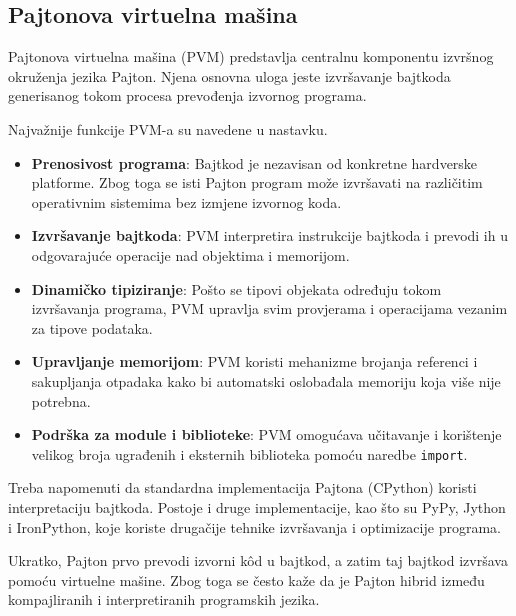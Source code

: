 \subsection{Pajtonova virtuelna mašina}

Pajtonova virtuelna mašina (PVM) predstavlja centralnu komponentu izvršnog okruženja jezika Pajton. Njena osnovna uloga jeste izvršavanje bajtkoda generisanog tokom procesa prevođenja izvornog programa.

Najvažnije funkcije PVM-a su navedene u nastavku. 

\begin{itemize}
	
	\item \textbf{Prenosivost programa}: Bajtkod je nezavisan od konkretne hardverske platforme. Zbog toga se isti Pajton program može izvršavati na različitim operativnim sistemima bez izmjene izvornog koda.
	
	\item \textbf{Izvršavanje bajtkoda}: PVM interpretira instrukcije bajtkoda i prevodi ih u odgovarajuće operacije nad objektima i memorijom.
	
	\item \textbf{Dinamičko tipiziranje}:  Pošto se tipovi objekata određuju tokom izvršavanja programa, PVM upravlja svim provjerama i operacijama vezanim za tipove podataka.
	
	\item \textbf{Upravljanje memorijom}: PVM koristi mehanizme brojanja referenci i sakupljanja otpadaka kako bi automatski oslobađala memoriju koja više nije potrebna.
	
	\item \textbf{Podrška za module i biblioteke}:  PVM omogućava učitavanje i korištenje velikog broja ugrađenih i eksternih biblioteka pomoću naredbe \texttt{import}.

\end{itemize}

Treba napomenuti da standardna implementacija Pajtona (CPython) koristi interpretaciju bajtkoda. Postoje i druge implementacije, kao što su PyPy, Jython i IronPython, koje koriste drugačije tehnike izvršavanja i optimizacije programa.

Ukratko, Pajton prvo prevodi izvorni kôd u bajtkod, a zatim taj bajtkod izvršava pomoću virtuelne mašine. Zbog toga se često kaže da je Pajton hibrid između kompajliranih i interpretiranih programskih jezika.


